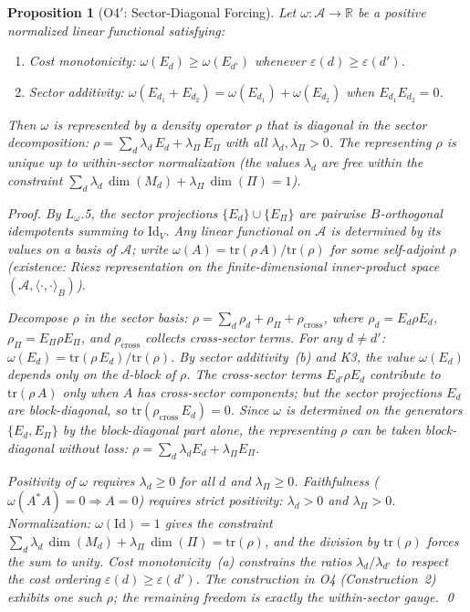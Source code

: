 \documentclass[11pt,a4paper]{article}
\newtheorem{proposition}[theorem]{Proposition}
\theoremstyle{definition}
\newcommand{\eps}{\varepsilon}
\newcommand{\tr}{\mathrm{tr}}
\begin{document}
\begin{proposition}[O4$'$: Sector-Diagonal Forcing]\label{prop:O4prime}
Let $\omega: \mathcal{A} \to \mathbb{R}$ be a positive normalized linear functional satisfying:
\begin{enumerate}[nosep,label=(\alph*),leftmargin=2em]
\item \textit{Cost monotonicity:} $\omega(E_d) \ge \omega(E_{d'})$ whenever $\eps(d) \ge \eps(d')$.
\item \textit{Sector additivity:} $\omega(E_{d_1} + E_{d_2}) = \omega(E_{d_1}) + \omega(E_{d_2})$ when $E_{d_1} E_{d_2} = 0$.
\end{enumerate}
Then $\omega$ is represented by a density operator $\rho$ that is diagonal in the sector decomposition: $\rho = \sum_d \lambda_d\,E_d + \lambda_\Pi\, E_\Pi$ with all $\lambda_d, \lambda_\Pi > 0$.  The representing $\rho$ is unique up to within-sector normalization (the values $\lambda_d$ are free within the constraint $\sum_d \lambda_d\,\dim(M_d) + \lambda_\Pi\,\dim(\Pi) = 1$).

\smallskip\noindent\textit{Proof.}  By $L_\omega$.5, the sector projections $\{E_d\} \cup \{E_\Pi\}$ are pairwise $B$-orthogonal idempotents summing to $\mathrm{Id}_V$.  Any linear functional on $\mathcal{A}$ is determined by its values on a basis of $\mathcal{A}$; write $\omega(A) = \tr(\rho\,A)/\tr(\rho)$ for some self-adjoint $\rho$ (existence: Riesz representation on the finite-dimensional inner-product space $(\mathcal{A}, \langle\cdot,\cdot\rangle_B)$).

Decompose $\rho$ in the sector basis: $\rho = \sum_d \rho_d + \rho_\Pi + \rho_{\mathrm{cross}}$, where $\rho_d = E_d \rho E_d$, $\rho_\Pi = E_\Pi \rho E_\Pi$, and $\rho_{\mathrm{cross}}$ collects cross-sector terms.  For any $d \ne d'$: $\omega(E_d) = \tr(\rho\,E_d)/\tr(\rho)$.  By sector additivity~(b) and K3, the value $\omega(E_d)$ depends only on the $d$-block of $\rho$.  The cross-sector terms $E_{d'} \rho E_d$ contribute to $\tr(\rho\,A)$ only when $A$ has cross-sector components; but the sector projections $E_d$ are block-diagonal, so $\tr(\rho_{\mathrm{cross}}\,E_d) = 0$.  Since $\omega$ is determined on the generators $\{E_d, E_\Pi\}$ by the block-diagonal part alone, the representing $\rho$ can be taken block-diagonal without loss: $\rho = \sum_d \lambda_d E_d + \lambda_\Pi E_\Pi$.

Positivity of $\omega$ requires $\lambda_d \ge 0$ for all $d$ and $\lambda_\Pi \ge 0$.  Faithfulness ($\omega(A^*A) = 0 \Rightarrow A = 0$) requires strict positivity: $\lambda_d > 0$ and $\lambda_\Pi > 0$.  Normalization: $\omega(\mathrm{Id}) = 1$ gives the constraint $\sum_d \lambda_d\,\dim(M_d) + \lambda_\Pi\,\dim(\Pi) = \tr(\rho)$, and the division by $\tr(\rho)$ forces the sum to unity.  Cost monotonicity~(a) constrains the ratios $\lambda_d/\lambda_{d'}$ to respect the cost ordering $\eps(d) \ge \eps(d')$.  The construction in O4 (Construction~2) exhibits one such $\rho$; the remaining freedom is exactly the within-sector gauge.  \qed


\end{proposition}
\end{document}
